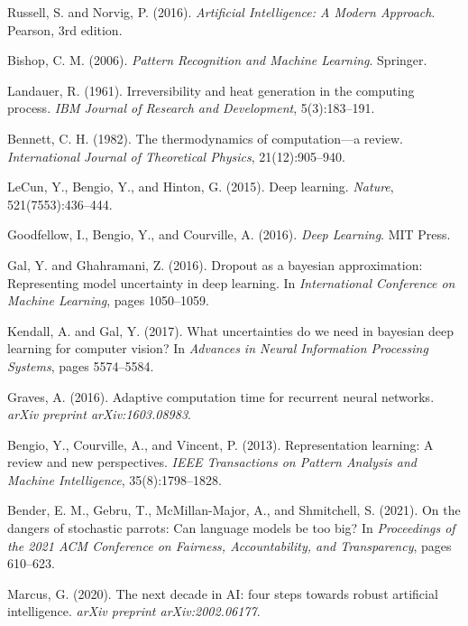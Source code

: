 \documentclass[11pt,a4paper]{article}
\begin{document}
\begin{thebibliography}{99}

Russell, S. and Norvig, P. (2016). \textit{Artificial Intelligence: A Modern Approach}. Pearson, 3rd edition.

Bishop, C. M. (2006). \textit{Pattern Recognition and Machine Learning}. Springer.

Landauer, R. (1961). Irreversibility and heat generation in the computing process. \textit{IBM Journal of Research and Development}, 5(3):183--191.

Bennett, C. H. (1982). The thermodynamics of computation—a review. \textit{International Journal of Theoretical Physics}, 21(12):905--940.

LeCun, Y., Bengio, Y., and Hinton, G. (2015). Deep learning. \textit{Nature}, 521(7553):436--444.

Goodfellow, I., Bengio, Y., and Courville, A. (2016). \textit{Deep Learning}. MIT Press.

Gal, Y. and Ghahramani, Z. (2016). Dropout as a bayesian approximation: Representing model uncertainty in deep learning. In \textit{International Conference on Machine Learning}, pages 1050--1059.

Kendall, A. and Gal, Y. (2017). What uncertainties do we need in bayesian deep learning for computer vision? In \textit{Advances in Neural Information Processing Systems}, pages 5574--5584.

Graves, A. (2016). Adaptive computation time for recurrent neural networks. \textit{arXiv preprint arXiv:1603.08983}.

Bengio, Y., Courville, A., and Vincent, P. (2013). Representation learning: A review and new perspectives. \textit{IEEE Transactions on Pattern Analysis and Machine Intelligence}, 35(8):1798--1828.

Bender, E. M., Gebru, T., McMillan-Major, A., and Shmitchell, S. (2021). On the dangers of stochastic parrots: Can language models be too big? In \textit{Proceedings of the 2021 ACM Conference on Fairness, Accountability, and Transparency}, pages 610--623.

Marcus, G. (2020). The next decade in AI: four steps towards robust artificial intelligence. \textit{arXiv preprint arXiv:2002.06177}.


\end{thebibliography}
\end{document}
